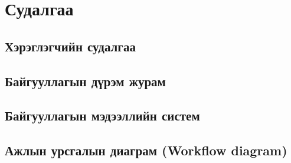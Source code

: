 \chapter{Судалгаа}
\section{Хэрэглэгчийн судалгаа}
\section{Байгууллагын дүрэм журам}
\section{Байгууллагын мэдээллийн систем}
\section{Ажлын урсгалын диаграм (Workflow diagram)}